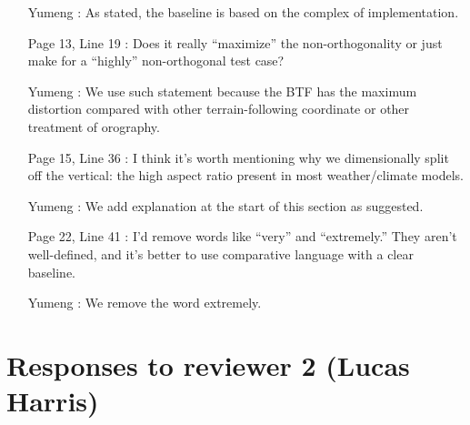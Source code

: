 \documentclass[12pt]{article}
\begin{document}
\begin{enumerate}
\item [Yumeng]: As stated, the baseline is based on the complex of implementation. 

\item [Page 13, Line 19]: Does it really ``maximize'' the non-orthogonality or just make for a ``highly'' non-orthogonal test case?

\item [Yumeng]: We use such statement because the BTF has the maximum distortion compared with other terrain-following coordinate or other treatment of orography.

\item [Page 15, Line 36]: I think it's worth mentioning why we dimensionally split off the vertical: the high aspect ratio present in most weather/climate models.

\item [Yumeng]: We add explanation at the start of this section as suggested.

\item [Page 22, Line 41]: I'd remove words like ``very'' and ``extremely.'' They aren't well-defined, and it's better to use comparative language with a clear baseline.

\item [Yumeng]: We remove the word extremely. 


\end{enumerate}

\section*{Responses to reviewer 2 (Lucas Harris)}
\end{document}

